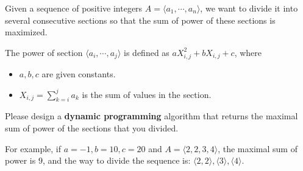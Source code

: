 
Given a sequence of positive integers $A=\langle a_1,\cdots,a_n\rangle$, we want to divide it into several consecutive sections so that the sum of power of these sections
is maximized.

The power of section $\langle a_i,\cdots,a_j\rangle$ is defined as $aX_{i,j}^2+bX_{i,j}+c$, where
\begin{itemize}
    \item $a,b,c$ are given constants.
    \item $X_{i,j}=\sum\limits_{k=i}^j a_k$ is the sum of values in the section.
\end{itemize}

Please design a \textbf{dynamic programming} algorithm that returns the maximal sum of power of the sections that you divided.

For example, if \(a=-1,b=10,c=20\) and \(A=\langle 2,2,3,4\rangle\), the maximal sum of power is \(9\), and the way to divide the sequence is: \(\langle 2,2\rangle,\langle 3\rangle,\langle 4\rangle\).

